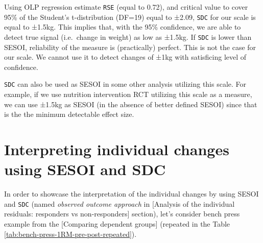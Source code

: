 \documentclass[
]{book}
\begin{document}
Using OLP regression estimate \texttt{RSE} (equal to 0.72), and critical value to cover 95\% of the Student's t-distribution (DF=19) equal to ±2.09, \texttt{SDC} for our scale is equal to ±1.5kg. This implies that, with the 95\% confidence, we are able to detect true signal (i.e.~change in weight) as low as ±1.5kg. If \texttt{SDC} is lower than SESOI, reliability of the measure is (practically) perfect. This is not the case for our scale. We cannot use it to detect changes of ±1kg with satisficing level of confidence.

\texttt{SDC} can also be used as SESOI in some other analysis utilizing this scale. For example, if we use nutrition intervention RCT utilizing this scale as a measure, we can use ±1.5kg as SESOI (in the absence of better defined SESOI) since that is the the minimum detectable effect size.

\hypertarget{interpreting-individual-changes-using-sesoi-and-sdc}{%
\section{Interpreting individual changes using SESOI and SDC}\label{interpreting-individual-changes-using-sesoi-and-sdc}}

In order to showcase the interpretation of the individual changes by using SESOI and \texttt{SDC} (named \emph{observed outcome approach} in {[}Analysis of the individual residuals: responders vs non-responders{]} section), let's consider bench press example from the {[}Comparing dependent groups{]} (repeated in the Table \ref{tab:bench-press-1RM-pre-post-repeated}).
\end{document}
